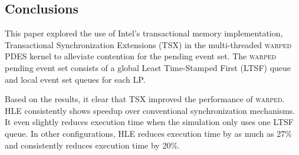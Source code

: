 \documentclass{sig-alternate}
\begin{document}

\subsection{Conclusions}\label{conclude}

This paper explored the use of Intel's transactional memory implementation, Transactional
Synchronization Extensions (TSX) in the multi-threaded \textsc{warped} PDES kernel to
alleviate contention for the pending event set.  The \textsc{warped} pending event set
consists of a global Least Time-Stamped First (LTSF) queue and local event set queues for
each LP.  

Based on the results, it clear that TSX improved the performance of \textsc{warped}.  HLE
consistently shows speedup over conventional synchronization mechanisms.  It even slightly
reduces execution time when the simulation only uses one LTSF queue.  In other
configurations, HLE reduces execution time by as much as 27\% and consistently reduces
execution time by 20\%.
\end{document}
